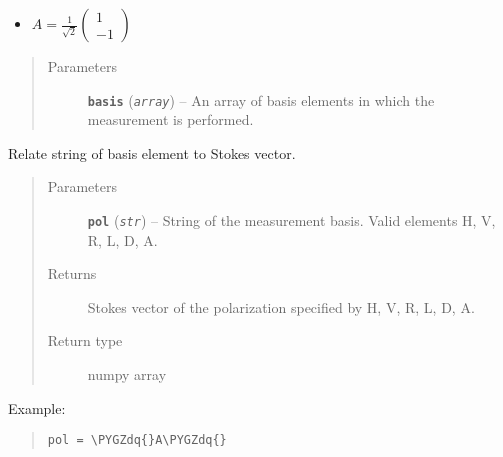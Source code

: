 \documentclass[letterpaper,10pt,english]{sphinxmanual}
\def\PYGZdq{\char`\"}
\begin{document}
\begin{fulllineitems}
\begin{description}
\begin{itemize}
\item {} 
\(A=\frac{1}{\sqrt{2}}\begin{pmatrix}1 \\ -1 \end{pmatrix}\)

\end{itemize}

\end{description}
\begin{quote}\begin{description}
\item[{Parameters}] \leavevmode
\textbf{\texttt{basis}} (\emph{\texttt{array}}) -- An array of basis elements in which the measurement is performed.

\end{description}\end{quote}

\begin{fulllineitems}
\label{modules:Tomography.DensityMatrix.basis_str_to_object}
Relate string of basis element to Stokes vector.
\begin{quote}\begin{description}
\item[{Parameters}] \leavevmode
\textbf{\texttt{pol}} (\emph{\texttt{str}}) -- String of the measurement basis. Valid elements H, V, R, L, D, A.

\item[{Returns}] \leavevmode
Stokes vector of the polarization specified by H, V, R, L, D, A.

\item[{Return type}] \leavevmode
numpy array

\end{description}\end{quote}

Example:
\begin{quote}

\begin{Verbatim}[commandchars=\\\{\}]
pol = \PYGZdq{}A\PYGZdq{}
\end{Verbatim}
\end{quote}

\end{fulllineitems}



\end{fulllineitems}
\end{document}
